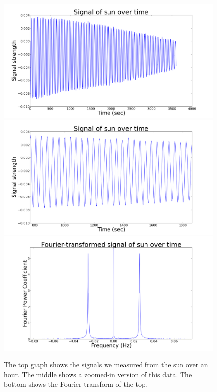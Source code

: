 \documentclass[11pt]{article}
\begin{document}
\begin{figure}
\centering
\includegraphics[scale=0.35]{garphs/sunhourvolt}
\includegraphics[scale=0.35]{garphs/sunhourzoom}
\includegraphics[scale=0.35]{garphs/sunhourfourier}
\caption{The top graph shows the signals we measured from the sun over an hour. The middle shows a zoomed-in version of this data. The bottom shows the Fourier transform of the top. \label{hoursun}}
\end{figure}
\end{document}
